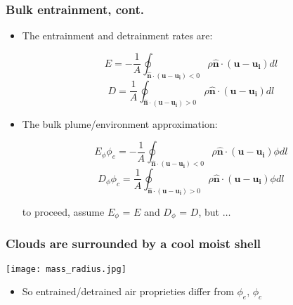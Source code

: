 \documentclass[fleqn,hyperref={colorlinks=true,linkcolor=blue,urlcolor=blue},numbers]{beamer}
\begin{document}
\begin{frame}
  \frametitle{Bulk entrainment, cont.}

  \begin{itemize}
  \item The entrainment and detrainment rates are:

\begin{equation*}
E = -\frac{1}{A}\oint_{\mathbf{\hat{n}}\cdot(\mathbf{u} - \mathbf{u_i}) < 0}
\rho\mathbf{\hat{n}}\cdot(\mathbf{u}-\mathbf{u_i})dl
\end{equation*}
\begin{equation*}
D = \frac{1}{A}\oint_{\mathbf{\hat{n}}\cdot(\mathbf{u} - \mathbf{u_i}) > 0}
\rho\mathbf{\hat{n}}\cdot(\mathbf{u}-\mathbf{u_i})dl
\end{equation*} \pause


\item The bulk plume/environment approximation:

\begin{equation*}
E_\phi \phi_e = -\frac{1}{A}\oint_{\mathbf{\hat{n}}\cdot(\mathbf{u} - \mathbf{u_i}) < 0}
\rho\mathbf{\hat{n}}\cdot(\mathbf{u}-\mathbf{u_i}) \phi dl
\end{equation*}
\begin{equation*}
D_\phi \phi_c = \frac{1}{A}\oint_{\mathbf{\hat{n}}\cdot(\mathbf{u} - \mathbf{u_i}) > 0}
\rho\mathbf{\hat{n}}\cdot(\mathbf{u}-\mathbf{u_i}) \phi dl
\end{equation*}

to proceed, assume  $E_\phi$ = $E$ and $D_\phi$ = $D$, but $\dots$
\end{itemize}


\end{frame}

\begin{frame}
  \frametitle{Clouds are surrounded by a cool moist shell }

\texttt{[image: mass\_radius.jpg]}

\pause
\begin{itemize}
\item So entrained/detrained air proprieties differ from $\phi_e$, $\phi_c$ 
\end{itemize}

\end{frame}
\end{document}
